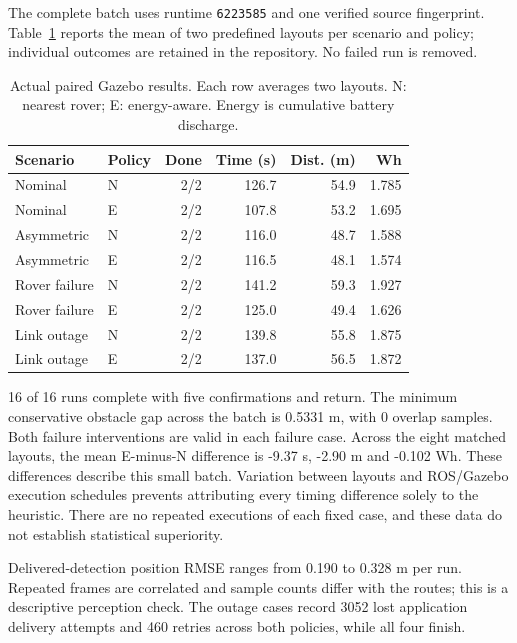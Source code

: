 The complete batch uses runtime \texttt{6223585} and one verified source
fingerprint. Table~\ref{tab:comparison} reports the mean of two predefined
layouts per scenario and policy; individual outcomes are retained in the
repository. No failed run is removed.

\begin{table}[t]
\caption{Actual paired Gazebo results. Each row averages two layouts.
N: nearest rover; E: energy-aware. Energy is cumulative battery discharge.}
\label{tab:comparison}
\centering
\small
\setlength{\tabcolsep}{4pt}
\begin{tabular}{llrrrr}
\toprule
Scenario & Policy & Done & Time (s) & Dist. (m) & Wh\\
\midrule
Nominal & N & 2/2 & 126.7 & 54.9 & 1.785\\
Nominal & E & 2/2 & 107.8 & 53.2 & 1.695\\
Asymmetric & N & 2/2 & 116.0 & 48.7 & 1.588\\
Asymmetric & E & 2/2 & 116.5 & 48.1 & 1.574\\
Rover failure & N & 2/2 & 141.2 & 59.3 & 1.927\\
Rover failure & E & 2/2 & 125.0 & 49.4 & 1.626\\
Link outage & N & 2/2 & 139.8 & 55.8 & 1.875\\
Link outage & E & 2/2 & 137.0 & 56.5 & 1.872\\
\bottomrule
\end{tabular}
\end{table}

16 of 16 runs complete with five confirmations and return. The minimum
conservative obstacle gap across the batch is 0.5331 m, with
0 overlap samples. Both failure interventions are valid in each
failure case. Across the eight matched layouts, the mean E-minus-N difference
is -9.37 s, -2.90 m and -0.102 Wh.
These differences describe this small batch. Variation between layouts and
ROS/Gazebo execution schedules prevents attributing every timing difference
solely to the heuristic. There are no repeated executions of each fixed case,
and these data do not establish statistical superiority.

Delivered-detection position RMSE ranges from 0.190 to
0.328 m per run. Repeated frames are correlated and sample
counts differ with the routes; this is a descriptive perception check. The outage
cases record 3052 lost application delivery attempts and
460 retries across both policies, while all four finish.
